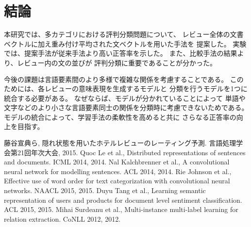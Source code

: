 \documentclass{ttisummary}
\begin{document}
\section{結論}

本研究では、多カテゴリにおける評判分類問題について、
レビュー全体の文書ベクトルに加え重み付け平均された文ベクトルを用いた手法を
提案した。
実験では、提案手法が従来手法\cite{fujitani15}より高い正答率を示した。
また、比較手法の結果より、レビュー内の文の並びが
評判分類に重要であることが分かった。

今後の課題は言語要素間のより多様で複雑な関係を考慮することである。
このためには、各レビューの意味表現を生成するモデルと
分類を行うモデルを1つに統合する必要がある。
なぜならば、モデルが分かれていることによって
単語や文字などのより小さな言語要素同士の関係を分類時に考慮できないためである。
モデルの統合によって、学習手法の柔軟性を高めると共に
さらなる正答率の向上を目指す。




\begin{thebibliography}{9}
  藤谷宣典ら,
  隠れ状態を用いたホテルレビューのレーティング予測.
  言語処理学会第21回年次大会, 2015.
  Quoc Le et al.,
  Distributed representations of sentences and documents.
  ICML 2014, 2014.
  Nal Kalchbrenner et al.,
  A convolutional neural network for modelling sentences.
  ACL 2014, 2014.
  Rie Johnson et al.,
  Effective use of word order for text categorization
  with convolutional neural networks.
  NAACL 2015, 2015.
  Duyu Tang et al.,
  Learning semantic representation of users and products
  for document level sentiment classification.
  ACL 2015, 2015.
  Mihai Surdeanu et al.,
  Multi-instance multi-label learning for relation extraction.
  CoNLL 2012, 2012.
\end{thebibliography}
\end{document}
